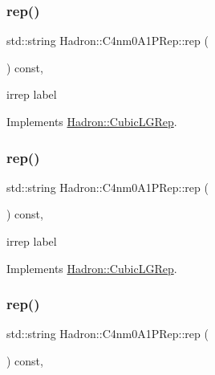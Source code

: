 \subsubsection{\texorpdfstring{rep()}{rep()}\hspace{0.1cm}{\footnotesize\ttfamily [1/3]}}
{\footnotesize\ttfamily std\+::string Hadron\+::\+C4nm0\+A1\+P\+Rep\+::rep (\begin{DoxyParamCaption}{ }\end{DoxyParamCaption}) const\hspace{0.3cm}{\ttfamily [inline]}, {\ttfamily [virtual]}}

irrep label 

Implements \mbox{\hyperlink{structHadron_1_1CubicLGRep_a50f5ddbb8f4be4cee0106fa9e8c75e6c}{Hadron\+::\+Cubic\+L\+G\+Rep}}.

\mbox{\label{structHadron_1_1C4nm0A1PRep_a16776c5723a87d39dce0e2c58297413f}} 
\subsubsection{\texorpdfstring{rep()}{rep()}\hspace{0.1cm}{\footnotesize\ttfamily [2/3]}}
{\footnotesize\ttfamily std\+::string Hadron\+::\+C4nm0\+A1\+P\+Rep\+::rep (\begin{DoxyParamCaption}{ }\end{DoxyParamCaption}) const\hspace{0.3cm}{\ttfamily [inline]}, {\ttfamily [virtual]}}

irrep label 

Implements \mbox{\hyperlink{structHadron_1_1CubicLGRep_a50f5ddbb8f4be4cee0106fa9e8c75e6c}{Hadron\+::\+Cubic\+L\+G\+Rep}}.

\mbox{\label{structHadron_1_1C4nm0A1PRep_a16776c5723a87d39dce0e2c58297413f}} 
\subsubsection{\texorpdfstring{rep()}{rep()}\hspace{0.1cm}{\footnotesize\ttfamily [3/3]}}
{\footnotesize\ttfamily std\+::string Hadron\+::\+C4nm0\+A1\+P\+Rep\+::rep (\begin{DoxyParamCaption}{ }\end{DoxyParamCaption}) const\hspace{0.3cm}{\ttfamily [inline]}, {\ttfamily [virtual]}}

